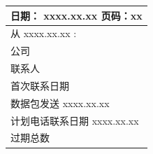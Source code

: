 \documentclass[]{article}
\date{}
\begin{document}
\begin{longtable}[]{@{}l@{}}
\toprule
日期： xxxx.xx.xx 页码：xx\tabularnewline
\midrule
\endhead
从 xxxx.xx.xx :\tabularnewline
公司\tabularnewline
联系人\tabularnewline
首次联系日期\tabularnewline
数据包发送 xxxx.xx.xx\tabularnewline
计划电话联系日期 xxxx.xx.xx\tabularnewline
过期总数\tabularnewline
\bottomrule
\end{longtable}
\end{document}
